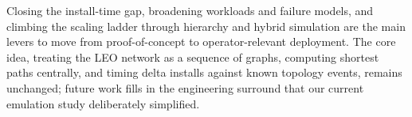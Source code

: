 Closing the install-time gap, broadening workloads and failure models, and
climbing the scaling ladder through hierarchy and hybrid simulation are the
main levers to move from proof-of-concept to operator-relevant deployment.
The core idea, treating the LEO network as a sequence of graphs, computing
shortest paths centrally, and timing delta installs against known topology
events, remains unchanged; future work fills in the engineering surround
that our current emulation study deliberately simplified.
